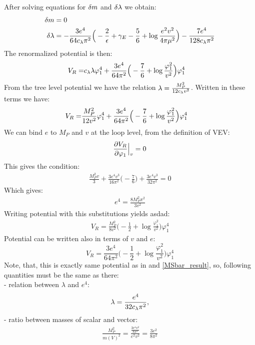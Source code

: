 After solving equations for $\delta m$ and $\delta\lambda$ we obtain:
\begin{align}
\delta m &= 0 \\
\delta\lambda &= -\frac{3e^4}{64c_\lambda\pi^2}\Big(-\frac{2}{\epsilon}+\gamma_E-\frac{5}{6}+
\log\frac{e^2v^2}{4\pi\mu^2}\Big)-\frac{7e^4}{128c_\lambda\pi^2}
\end{align}
The renormalized potential is then:
\begin{align}
V_R = &c_\lambda\lambda\varphi_1^4 +
\frac{3e^4}{64\pi^2}\Big(-\frac{7}{6}+\log\frac{\varphi_1^2}{v^2}\Big)\varphi_1^4
\end{align}
From the tree level potential we have the relation $\lambda = \frac{M_P^2}{12c_\lambda v^2}$. 
Written in these terms we have:
\begin{align}
V_R = &\frac{M_P^2}{12v^2}\varphi_1^4 +
\frac{3e^4}{64\pi^2}\Big(-\frac{7}{6}+\log\frac{\varphi_1^2}{v^2}\Big)\varphi_1^4
\end{align}
We can bind $e$ to $M_P$ and $v$ at the loop level, from the definition of VEV:
\begin{align}
\frac{\partial V_R}{\partial \varphi_1} \Big|_v= 0
\end{align}
This gives the condition:
\begin{align}
\frac{M_P^2v}{3}+\frac{3e^4v^3}{16\pi^2}\Big(-\frac{7}{6}\Big)+\frac{3e^4v^3}{32\pi^2}=0
\end{align}
Which gives:
\begin{align}
e^4 = \frac{8M_P^2\pi^2}{3v^2}
\end{align}
Writing potential with this substitutions yields asdad:
\begin{align}
V_R = \frac{M_P^2}{8v^2}\Big(-\frac{1}{2}+\log\frac{\varphi_1^2}{v^2}\Big)\varphi_1^4
\end{align}
Potential can be written also in terms of $v$ and $e$:
\begin{equation}
V_R=\frac{3e^4}{64\pi^2}\Big(-\frac{1}{2}+\log\frac{\varphi_1^2}{v^2}\Big)\varphi_1^4
\end{equation}
Note, that, this is exactly same potential as in \cite{Coleman1973} and \ref{MSbar_result}, 
so, following quantities must be the same as there: \\
\hspace*{0.5cm}- relation between $\lambda$ and $e^4$:
\begin{align}
\lambda = \frac{e^4}{32c_\lambda\pi^2},
\end{align}
\hspace*{0.5cm}- ratio between masses of scalar and vector:
\begin{align}
\frac{M_P^2}{m(V)^2} = \frac{\frac{3e^4v^2}{8\pi^2}}{e^2v^2} = \frac{3e^2}{8\pi^2}
\end{align}



